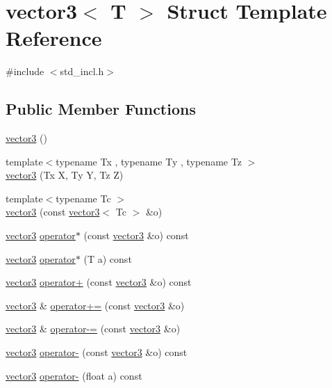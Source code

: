\hypertarget{structvector3}{}\section{vector3$<$ T $>$ Struct Template Reference}
\label{structvector3}


{\ttfamily \#include $<$std\+\_\+incl.\+h$>$}

\subsection*{Public Member Functions}
\begin{DoxyCompactItemize}
\item 
\hyperlink{structvector3_ad2d29b21c4b3d1d03c3d37ec3c11f035}{vector3} ()
\item 
{\footnotesize template$<$typename Tx , typename Ty , typename Tz $>$ }\\\hyperlink{structvector3_a6186c133e4cbec341fe0f2860e40cc07}{vector3} (Tx X, Ty Y, Tz Z)
\item 
{\footnotesize template$<$typename Tc $>$ }\\\hyperlink{structvector3_a6e767e6ee53e894826d7e132765a5212}{vector3} (const \hyperlink{structvector3}{vector3}$<$ Tc $>$ \&o)
\item 
\hyperlink{structvector3}{vector3} \hyperlink{structvector3_ae7c27003a1fd4e4965d86e9933ff6dd2}{operator$\ast$} (const \hyperlink{structvector3}{vector3} \&o) const 
\item 
\hyperlink{structvector3}{vector3} \hyperlink{structvector3_adb80a78a3b5d4e2997a4ac54bd44dfd9}{operator$\ast$} (T a) const 
\item 
\hyperlink{structvector3}{vector3} \hyperlink{structvector3_aac13c3909b52664d7aa578315f2834da}{operator+} (const \hyperlink{structvector3}{vector3} \&o) const 
\item 
\hyperlink{structvector3}{vector3} \& \hyperlink{structvector3_a036d656692b4443a429469d3f9343fea}{operator+=} (const \hyperlink{structvector3}{vector3} \&o)
\item 
\hyperlink{structvector3}{vector3} \& \hyperlink{structvector3_a5b4028d79ff347fe896a7a1f0339a494}{operator-\/=} (const \hyperlink{structvector3}{vector3} \&o)
\item 
\hyperlink{structvector3}{vector3} \hyperlink{structvector3_a5acc31dfddfa1039f7405c9fcfd8f6ed}{operator-\/} (const \hyperlink{structvector3}{vector3} \&o) const 
\item 
\hyperlink{structvector3}{vector3} \hyperlink{structvector3_abb7276f5bed82c39c21d8322b43ab94e}{operator-\/} (float a) const 

\end{DoxyCompactItemize}
